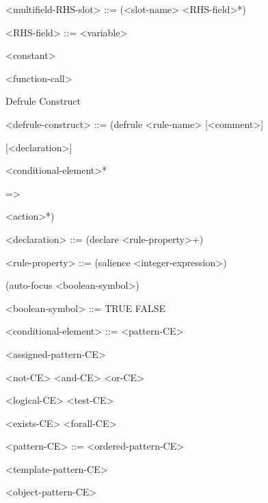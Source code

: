 \documentclass[letterpaper,10pt,english]{sphinxmanual}
\begin{document}
\textless{}multifield-RHS-slot\textgreater{} ::= (\textless{}slot-name\textgreater{} \textless{}RHS-field\textgreater{}*)

\textless{}RHS-field\textgreater{} ::= \textless{}variable\textgreater{} \textbar{}

\textless{}constant\textgreater{} \textbar{}

\textless{}function-call\textgreater{}

Defrule Construct

\textless{}defrule-construct\textgreater{} ::= (defrule \textless{}rule-name\textgreater{} {[}\textless{}comment\textgreater{}{]}

{[}\textless{}declaration\textgreater{}{]}

\begin{DUlineblock}{0em}
\item[] \textless{}conditional-element\textgreater{}*
\item[] =\textgreater{}
\item[] \textless{}action\textgreater{}*)
\end{DUlineblock}

\textless{}declaration\textgreater{} ::= (declare \textless{}rule-property\textgreater{}+)

\textless{}rule-property\textgreater{} ::= (salience \textless{}integer-expression\textgreater{}) \textbar{}

(auto-focus \textless{}boolean-symbol\textgreater{})

\textless{}boolean-symbol\textgreater{} ::= TRUE \textbar{} FALSE

\textless{}conditional-element\textgreater{} ::= \textless{}pattern-CE\textgreater{} \textbar{}

\textless{}assigned-pattern-CE\textgreater{} \textbar{}

\textless{}not-CE\textgreater{} \textbar{} \textless{}and-CE\textgreater{} \textbar{} \textless{}or-CE\textgreater{} \textbar{}

\textless{}logical-CE\textgreater{} \textbar{} \textless{}test-CE\textgreater{} \textbar{}

\textless{}exists-CE\textgreater{} \textbar{} \textless{}forall-CE\textgreater{}

\textless{}pattern-CE\textgreater{} ::= \textless{}ordered-pattern-CE\textgreater{} \textbar{}

\textless{}template-pattern-CE\textgreater{} \textbar{}

\textless{}object-pattern-CE\textgreater{}
\end{document}
